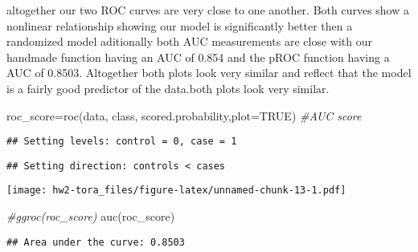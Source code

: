 \documentclass[
]{article}
\newenvironment{Shaded}{\begin{snugshade}}{\end{snugshade}}
\newcommand{\AttributeTok}[1]{\textcolor[rgb]{0.77,0.63,0.00}{#1}}
\newcommand{\CommentTok}[1]{\textcolor[rgb]{0.56,0.35,0.01}{\textit{#1}}}
\newcommand{\ConstantTok}[1]{\textcolor[rgb]{0.00,0.00,0.00}{#1}}
\newcommand{\FunctionTok}[1]{\textcolor[rgb]{0.00,0.00,0.00}{#1}}
\newcommand{\NormalTok}[1]{#1}
\newcommand{\OtherTok}[1]{\textcolor[rgb]{0.56,0.35,0.01}{#1}}
\begin{document}
altogether our two ROC curves are very close to one another. Both curves
show a nonlinear relationship showing our model is significantly better
then a randomized model aditionally both AUC measurements are close with
our handmade function having an AUC of 0.854 and the pROC function
having a AUC of 0.8503. Altogether both plots look very similar and
reflect that the model is a fairly good predictor of the data.both plots
look very similar.

\begin{Shaded}
\begin{Highlighting}[]
\NormalTok{roc\_score}\OtherTok{=}\FunctionTok{roc}\NormalTok{(data, class, scored.probability,}\AttributeTok{plot=}\ConstantTok{TRUE}\NormalTok{) }\CommentTok{\#AUC score}
\end{Highlighting}
\end{Shaded}

\begin{verbatim}
## Setting levels: control = 0, case = 1
\end{verbatim}

\begin{verbatim}
## Setting direction: controls < cases
\end{verbatim}

\texttt{[image: hw2-tora\_files/figure-latex/unnamed-chunk-13-1.pdf]}

\begin{Shaded}
\begin{Highlighting}[]
\CommentTok{\#ggroc(roc\_score)}
\FunctionTok{auc}\NormalTok{(roc\_score)}
\end{Highlighting}
\end{Shaded}

\begin{verbatim}
## Area under the curve: 0.8503
\end{verbatim}
\end{document}
